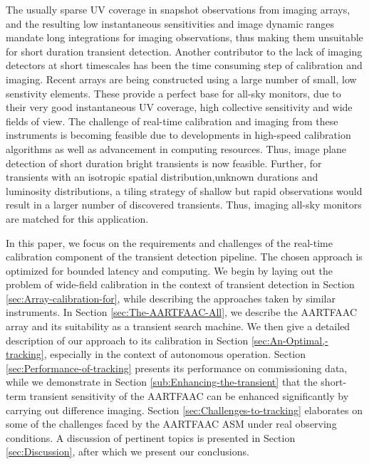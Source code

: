 \documentclass{aa}
\begin{document}
The usually sparse UV coverage in snapshot observations from imaging arrays, and
the resulting  low instantaneous sensitivities and image  dynamic ranges mandate
long  integrations for  imaging observations,  thus making  them  unsuitable for
short duration transient detection.  Another  contributor to the lack of imaging
detectors at  short timescales has been  the time consuming  step of calibration
and imaging. Recent arrays are being  constructed using a large number of small,
low senstivity elements. These provide  a perfect base for all-sky monitors, due
to their  very good instantaneous  UV coverage, high collective  sensitivity and
wide fields  of view.  The challenge of  real-time calibration and  imaging from
these  instruments  is  becoming  feasible  due to  developments  in  high-speed
calibration  algorithms as  well as  advancement in  computing  resources. Thus,
image   plane   detection  of   short   duration   bright   transients  is   now
feasible. Further, for transients with an isotropic spatial distribution,unknown
durations and luminosity  distributions, a tiling strategy of  shallow but rapid
observations would  result in  a larger number  of discovered  transients. Thus,
imaging all-sky monitors are matched for this application.

In this  paper, we  focus on  the requirements and  challenges of  the real-time
calibration component of the  transient detection pipeline.  The chosen approach
is optimized  for bounded  latency and  computing.  We begin  by laying  out the
problem  of wide-field  calibration in  the  context of  transient detection  in
Section \ref{sec:Array-calibration-for},  while describing the  approaches taken
by similar  instruments. In Section \ref{sec:The-AARTFAAC-All},  we describe the
AARTFAAC array and its suitability as a transient search machine. We then give a
detailed   description  of   our  approach   to  its   calibration   in  Section
\ref{sec:An-Optimal,-tracking},   especially  in   the  context   of  autonomous
operation. Section \ref{sec:Performance-of-tracking} presents its performance on
commissioning      data,      while      we     demonstrate      in      Section
\ref{sub:Enhancing-the-transient} that  the short-term transient  sensitivity of
the  AARTFAAC   can  be  enhanced  significantly  by   carrying  out  difference
imaging.  Section  \ref{sec:Challenges-to-tracking} elaborates  on  some of  the
challenges  faced  by  the  AARTFAAC  ASM under  real  observing  conditions.  A
discussion  of pertinent  topics is  presented in  Section \ref{sec:Discussion},
after which we present our conclusions.
\end{document}
